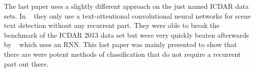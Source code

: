 \documentclass{utue} %
\begin{document}
The last paper uses a slightly different approach on the just named ICDAR data sets. In ~\cite{DBLP:journals/corr/HeH0Y15} they only use a text-attentional convolutional neural networks for scene text detection without any recurrent part. They were able to break the benchmark of the ICDAR 2013 data set but were very quickly beaten afterwards by ~\cite{DBLP:journals/corr/TianHHH016} which uses an RNN. This last paper was mainly presented to show that there are were potent methods of classification that do not require a recurrent part out there.\\




\end{document}
